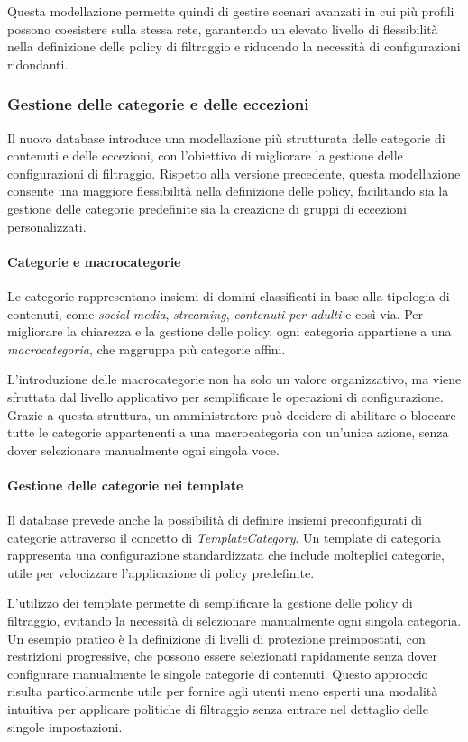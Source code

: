Questa modellazione permette quindi di gestire scenari avanzati in cui più profili possono coesistere sulla stessa rete, garantendo un elevato livello di flessibilità nella definizione delle policy di filtraggio e riducendo la necessità di configurazioni ridondanti.

\subsubsection{Gestione delle categorie e delle eccezioni}
Il nuovo database introduce una modellazione più strutturata delle categorie di contenuti e delle eccezioni, con l'obiettivo di migliorare la gestione delle configurazioni di filtraggio. Rispetto alla versione precedente, questa modellazione consente una maggiore flessibilità nella definizione delle policy, facilitando sia la gestione delle categorie predefinite sia la creazione di gruppi di eccezioni personalizzati.

\paragraph{Categorie e macrocategorie}
Le categorie rappresentano insiemi di domini classificati in base alla tipologia di contenuti, come \emph{social media}, \emph{streaming}, \emph{contenuti per adulti} e così via. Per migliorare la chiarezza e la gestione delle policy, ogni categoria appartiene a una \emph{macrocategoria}, che raggruppa più categorie affini.

L'introduzione delle macrocategorie non ha solo un valore organizzativo, ma viene sfruttata dal livello applicativo per semplificare le operazioni di configurazione. Grazie a questa struttura, un amministratore può decidere di abilitare o bloccare tutte le categorie appartenenti a una macrocategoria con un'unica azione, senza dover selezionare manualmente ogni singola voce.

\paragraph{Gestione delle categorie nei template}
Il database prevede anche la possibilità di definire insiemi preconfigurati di categorie attraverso il concetto di \emph{TemplateCategory}. Un template di categoria rappresenta una configurazione standardizzata che include molteplici categorie, utile per velocizzare l’applicazione di policy predefinite.

L’utilizzo dei template permette di semplificare la gestione delle policy di filtraggio, evitando la necessità di selezionare manualmente ogni singola categoria. Un esempio pratico è la definizione di livelli di protezione preimpostati, con restrizioni progressive, che possono essere selezionati rapidamente senza dover configurare manualmente le singole categorie di contenuti. Questo approccio risulta particolarmente utile per fornire agli utenti meno esperti una modalità intuitiva per applicare politiche di filtraggio senza entrare nel dettaglio delle singole impostazioni.


